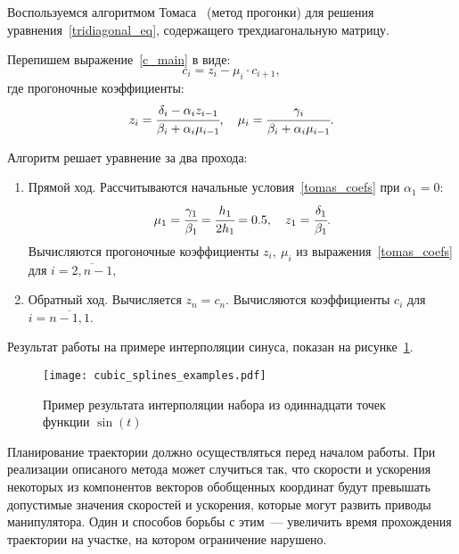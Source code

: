 Воспользуемся алгоритмом Томаса~\cite{datta2010numerical} (метод прогонки) для решения уравнения~\eqref{tridiagonal_eq}, содержащего трехдиагональную матрицу.

Перепишем выражение~\eqref{c_main} в виде:
\begin{equation}
	c_i = z_i - \mu_i \cdot c_{i+1},
\end{equation}
где прогоночные коэффициенты:
\begin{gather}\label{tomas_coefs}
	z_i = \cfrac{\delta_i - \alpha_i z_{i-1}}{\beta_i + \alpha_i \mu_{i-1}},
	\quad
	\mu_i = \cfrac{\gamma_i}{\beta_i + \alpha_i \mu_{i-1}}.
\end{gather}

Алгоритм решает уравнение за два прохода:
\begin{enumerate}
	\item Прямой ход. Рассчитываются начальные условия~\eqref{tomas_coefs} при $ \alpha_1 = 0 $:
	\begin{gather}
	\mu_1 = \cfrac{\gamma_1}{\beta_1} = \cfrac{h_1}{2 h_1} = 0.5, 
	\quad
	z_1 = \cfrac{\delta_1}{\beta_1}.
	\end{gather}
	Вычисляются прогоночные коэффициенты $ z_i, \: \mu_i $ из выражения~\eqref{tomas_coefs} для $ i = \overline{2,n-1} $,
	\item Обратный ход. Вычисляется $ z_n = c_n $.
	Вычисляются коэффициенты $ c_i $ для $ i = \overline{n-1,1} $.
\end{enumerate}

Результат работы на примере интерполяции синуса, показан на рисунке~\ref{img:cubic_splines_method_test}.
\begin{figure}[h!]
	\centering\texttt{[image: cubic\_splines\_examples.pdf]}
	\vspace{0.5cm}
	\caption{Пример результата интерполяции набора из одиннадцати точек функции $\sin(t)$}
	\label{img:cubic_splines_method_test}
\end{figure}

Планирование траектории должно осуществляться перед началом работы. При реализации описаного метода может случиться так, что скорости и ускорения некоторых из компонентов векторов обобщенных координат будут превышать допустимые значения скоростей и ускорения, которые могут развить приводы манипулятора. Один и способов борьбы с этим~--- увеличить время прохождения траектории на участке, на котором ограничение нарушено.



